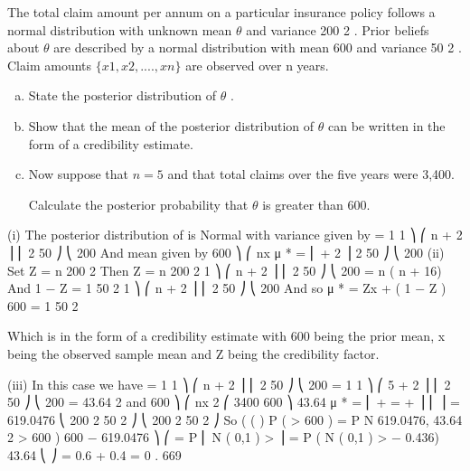 \documentclass[a4paper,12pt]{article}
\begin{document}
The total claim amount per annum on a particular insurance policy follows a normal distribution with unknown mean $\theta$ and variance 200 2 . Prior beliefs about $\theta$ are described by a normal distribution with mean 600 and variance 50 2 . Claim amounts
$\{x 1 , x 2 , ... ., x n\}$ are observed over n years.

\begin{enumerate}[(a)]
\item State the posterior distribution of $\theta$ .
\item Show that the mean of the posterior distribution of $\theta$ can be written in the
form of a credibility estimate.


\item Now suppose that $n=5$ and that total claims over the five years were 3,400.

Calculate the posterior probability that $\theta$ is greater than 600.
\end{enumerate}



(i)
The posterior distribution of \theta is Normal with variance given by
 =
1
1 ⎞
⎛ n
+ 2 ⎟
⎜
2
50 ⎠
⎝ 200
And mean given by
600 ⎞
⎛ nx
μ * =  ⎜
+ 2 ⎟
2
50 ⎠
⎝ 200
(ii)
Set
Z = 
n
200 2
Then
Z =
n
200 2
1 ⎞
⎛ n
+ 2 ⎟
⎜
2
50 ⎠
⎝ 200
=
n
( n + 16)
And
1 − Z =
1
50 2
1 ⎞
⎛ n
+ 2 ⎟
⎜
2
50 ⎠
⎝ 200
And so
μ * = Zx + ( 1 − Z ) 600
= 
1
50 2

Which is in the form of a credibility estimate with 600 being the prior mean, x being the observed sample mean and Z being the credibility factor.

(iii)
In this case we have
 =
1
1 ⎞
⎛ n
+ 2 ⎟
⎜
2
50 ⎠
⎝ 200
=
1
1 ⎞
⎛ 5
+ 2 ⎟
⎜
2
50 ⎠
⎝ 200
= 43.64 2
and
600 ⎞
⎛ nx
2 ⎛ 3400 600 ⎞
43.64
μ * =  ⎜
+
=
+
⎟
⎜
⎟ = 619.0476
⎝ 200 2 50 2 ⎠
⎝ 200 2 50 2 ⎠
So
( (
)
P ( \theta > 600 ) = P N 619.0476, 43.64 2 > 600
)
600 − 619.0476 ⎞
⎛
= P ⎜ N ( 0,1 ) >
⎟ = P ( N ( 0,1 ) > − 0.436)
43.64
⎝
⎠
= 0.6  + 0.4 
= 0 . 669



\end{document}
